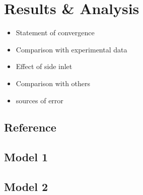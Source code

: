 \chapter{Results \& Analysis}
\label{ch:res}

\begin{itemize}
	\item Statement of convergence
	\item Comparison with experimental data
	\item Effect of side inlet
	\item Comparison with others
	\item sources of error
\end{itemize}

\section{Reference}
\label{sec:res_ref}


\section{Model 1}
\label{sec:res_mod1}

\section{Model 2}
\label{sec:res_mod2}
